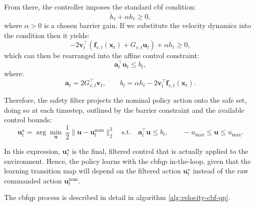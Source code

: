 From there, the controller imposes the standard \acs{cbf} condition:
\[
\dot{h}_t + \alpha h_t \ge 0,
\]
where $\alpha>0$ is a chosen barrier gain. If we substitute the velocity dynamics into the condition then it yields:
\[
-2\mathbf{v}_t^\top\left(\mathbf{f}_{v,t}(\mathbf{x}_t)+G_{v,t}\mathbf{u}_t\right)
+ \alpha h_t \ge 0,
\]
which can then be rearranged into the affine control constraint:
\[
\mathbf{a}_t^\top \mathbf{u}_t \le b_t,
\]
where:
\[
\mathbf{a}_t = 2G_{v,t}^\top\mathbf{v}_t,
\qquad
b_t = \alpha h_t - 2\mathbf{v}_t^\top \mathbf{f}_{v,t}(\mathbf{x}_t).
\]

Therefore, the safety filter projects the nominal policy action onto the safe set, doing so at each timestep, outlined by the barrier constraint and the available control bounds:
\[
\mathbf{u}_t^\star =
\arg\min_{\mathbf{u}}\ \frac12\|\mathbf{u}-\mathbf{u}_t^{\mathrm{nom}}\|_2^2
\quad \text{s.t.} \quad
\mathbf{a}_t^\top \mathbf{u} \le b_t,\qquad
-u_{\max}\le \mathbf{u}\le u_{\max}.
\]

In this expression, $\mathbf{u}_t^\star$ is the final, filtered control that is actually applied to the environment. Hence, the policy learns with the \acs{cbfqp} in-the-loop, given that the learning transition map will depend on the filtered action $\mathbf{u}_t^\star$ instead of the raw commanded action $\mathbf{u}_t^{\mathrm{nom}}$.

The \acs{cbfqp} process is described in detail in algorithm \ref{alg:velocity-cbf-qp}.

